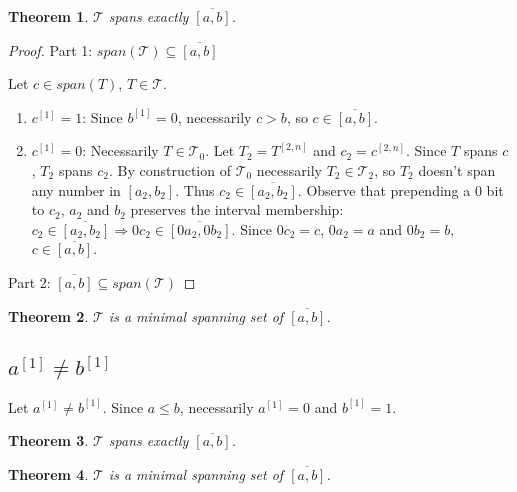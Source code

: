 \documentclass{article}
\theoremstyle{plain}
\newtheorem{theorem}{Theorem}[subsection]
\theoremstyle{definition}
\newcommand{\interval}[2]{[#1, #2]}
\newcommand{\finterval}[2]{\overline{\interval{#1}{#2}}}
\newcommand{\bit}[2]{#1^{[#2]}}
\newcommand{\bits}[3]{#1^{\interval{#2}{#3}}}
\begin{document}
\begin{theorem}
$\mathcal{T}$ spans exactly $\finterval{a}{b}$.
\end{theorem}

\begin{proof}
Part 1: $span(\mathcal{T}) \subseteq \finterval{a}{b}$

Let $c \in span(T)$, $T \in \mathcal{T}$.

\begin{enumerate}
\item $\bit{c}{1} = 1$: Since $\bit{b}{1} = 0$, necessarily $c > b$, so $c \in \finterval{a}{b}$.
\item $\bit{c}{1} = 0$: Necessarily $T \in \mathcal{T}_0$.
Let $T_2 = \bits{T}{2}{n}$ and $c_2 = \bits{c}{2}{n}$.
Since $T$ spans $c$, $T_2$ spans $c_2$.
By construction of $\mathcal{T}_0$ necessarily $T_2 \in \mathcal{T}_2$,
so $T_2$ doesn't span any number in $\interval{a_2}{b_2}$.
Thus $c_2 \in \finterval{a_2}{b_2}$.
Observe that prepending a $0$ bit to $c_2$, $a_2$ and $b_2$ preserves the interval membership:
$c_2 \in \finterval{a_2}{b_2} \Rightarrow 0 c_2 \in \finterval{0 a_2}{0 b_2}$.
Since $0 c_2 = c$, $0 a_2 = a$ and $0 b_2 = b$,
$c \in \finterval{a}{b}$.
\end{enumerate}

Part 2: $\finterval{a}{b} \subseteq span(\mathcal{T})$
\end{proof}

\begin{theorem}
$\mathcal{T}$ is a minimal spanning set of $\finterval{a}{b}$.
\end{theorem}


\subsection{$\bit{a}{1} \neq \bit{b}{1}$}
Let $\bit{a}{1} \neq \bit{b}{1}$.
Since $a \leq b$, necessarily $\bit{a}{1} = 0$ and $\bit{b}{1} = 1$.


\begin{theorem}
$\mathcal{T}$ spans exactly $\finterval{a}{b}$.
\end{theorem}

\begin{theorem}
$\mathcal{T}$ is a minimal spanning set of $\finterval{a}{b}$.
\end{theorem}




\printglossaries
\end{document}
